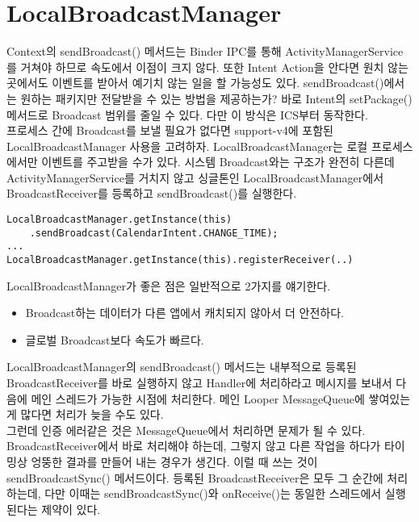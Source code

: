 \section{LocalBroadcastManager}
Context의 sendBroadcast() 메서드는 Binder IPC를 통해 ActivityManagerService를 거쳐야 하므로 속도에서 이점이 크지 않다. 또한 Intent Action을 안다면 원치 않는 곳에서도 이벤트를 받아서 예기치 않는 일을 할 가능성도 있다.
sendBroadcast()에서는 원하는 패키지만 전달받을 수 있는 방법을 제공하는가?
바로 Intent의 setPackage() 메서드로 Broadcast 범위를 줄일 수 있다. 
다만 이 방식은 ICS부터 동작한다.\\

프로세스 간에 Broadcast를 보낼 필요가 없다면 support-v4에 포함된 LocalBroadcastManager 사용을 고려하자. 
LocalBroadcastManager는 로컬 프로세스에서만 이벤트를 주고받을 수가 있다.
시스템 Broadcast와는 구조가 완전히 다른데 ActivityManagerService를 거치지 않고 싱글톤인 LocalBroadcastManager에서 BroadcastReceiver를 등록하고 sendBroadcast()를 실행한다.

\begin{lstlisting}[frame=single] 
LocalBroadcastManager.getInstance(this)
	.sendBroadcast(CalendarIntent.CHANGE_TIME);
...
LocalBroadcastManager.getInstance(this).registerReceiver(..)
\end{lstlisting}

LocalBroadcastManager가 좋은 점은 일반적으로 2가지를 얘기한다.
\begin{itemize}
\item Broadcast하는 데이터가 다른 앱에서 캐치되지 않아서 더 안전하다.
\item 글로벌 Broadcast보다 속도가 빠르다.
\end{itemize}

LocalBroadcastManager의 sendBroadcast() 메서드는 내부적으로 등록된 BroadcastReceiver를 바로 실행하지 않고 Handler에 처리하라고 메시지를 보내서 다음에 메인 스레드가 가능한 시점에 처리한다. 메인 Looper MessageQueue에 쌓여있는 게 많다면 처리가 늦을 수도 있다.\\

그런데 인증 에러같은 것은 MessageQueue에서 처리하면 문제가 될 수 있다.
BroadcastReceiver에서 바로 처리해야 하는데, 그렇지 않고 다른 작업을 하다가 타이밍상 엉뚱한 결과를 만들어 내는 경우가 생긴다. 
이럴 때 쓰는 것이 sendBroadcastSync() 메서드이다. 
등록된 BroadcastReceiver은 모두 그 순간에 처리하는데, 다만 이때는 sendBroadcastSync()와 onReceive()는 동일한 스레드에서 실행된다는 제약이 있다.\\

